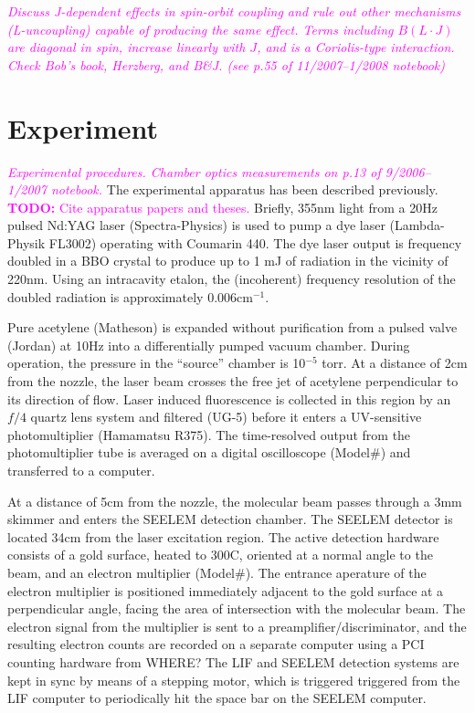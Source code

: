 \documentclass[12pt]{mitthesis}
\newcommand{\TODO} [1]{\textcolor{magenta}{\textbf{TODO:} #1}}
\newcommand{\POINT}[1]{\textcolor{magenta}{\emph{#1}}}
\newcommand{\rcm}{cm$^{-1}$}
\begin{document}
\POINT{Discuss J-dependent effects in spin-orbit coupling and rule out
  other mechanisms (L-uncoupling) capable of producing the same
  effect. Terms including $B(L \cdot J)$ are diagonal in spin,
  increase linearly with $J$, and is a Coriolis-type interaction.
  Check Bob's book, Herzberg, and B\&J.  (see p.55 of 11/2007--1/2008
  notebook)}



\section{Experiment}

\POINT{Experimental procedures.  Chamber optics measurements on p.13
  of 9/2006--1/2007 notebook.}  The experimental apparatus has been
described previously.  \TODO{Cite apparatus papers and theses.}
Briefly, 355nm light from a 20Hz pulsed Nd:YAG laser (Spectra-Physics)
is used to pump a dye laser (Lambda-Physik FL3002) operating with
Coumarin 440.  The dye laser output is frequency doubled in a BBO
crystal to produce up to 1 mJ of radiation in the vicinity of 220nm.
Using an intracavity etalon, the (incoherent) frequency resolution of
the doubled radiation is approximately 0.006\rcm.

Pure acetylene (Matheson) is expanded without purification from a
pulsed valve (Jordan) at 10Hz into a differentially pumped vacuum
chamber.  During operation, the pressure in the ``source'' chamber is
10$^{-5}$ torr.  At a distance of 2cm from the nozzle, the laser beam
crosses the free jet of acetylene perpendicular to its direction of
flow.  Laser induced fluorescence is collected in this region by an
$f/4$ quartz lens system and filtered (UG-5) before it enters a
UV-sensitive photomultiplier (Hamamatsu R375).  The time-resolved
output from the photomultiplier tube is averaged on a digital
oscilloscope (Model\#) and transferred to a computer.

At a distance of 5cm from the nozzle, the molecular beam passes
through a 3mm skimmer and enters the SEELEM detection chamber.  The
SEELEM detector is located 34cm from the laser excitation region.  The
active detection hardware consists of a gold surface, heated to 300C, oriented
at a normal angle to the beam, and an electron multiplier (Model\#).
The entrance aperature of the electron multiplier is positioned
immediately adjacent to the gold surface at a perpendicular angle,
facing the area of intersection with the molecular beam.  The electron
signal from the multiplier is sent to a preamplifier/discriminator,
and the resulting electron counts are recorded on a separate computer
using a PCI counting hardware from WHERE?  The LIF and SEELEM
detection systems are kept in sync by means of a stepping motor, which
is triggered triggered from the LIF computer to periodically hit the
space bar on the SEELEM computer.
\end{document}
